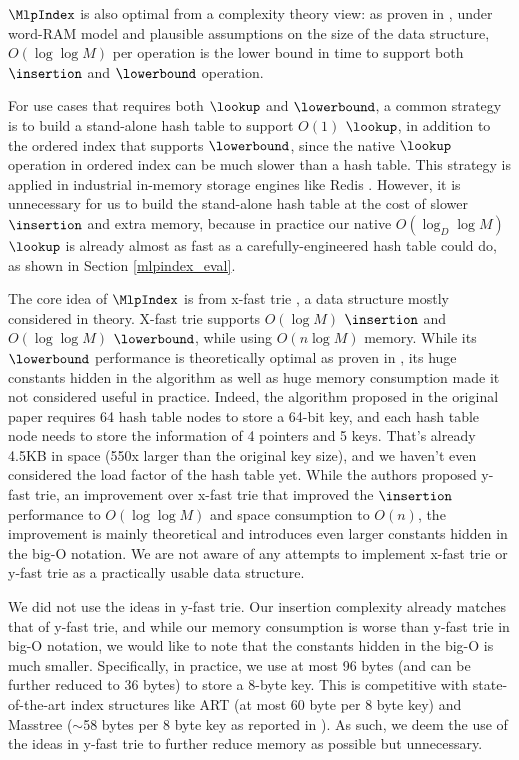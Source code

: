 \documentclass[11pt, usletter]{article}
\begin{document}
$\MlpIndex$ is also optimal from a complexity theory view: as proven in \cite{ajtai88comb-lowerbound}, 
under word-RAM model and plausible assumptions on the size of the data structure, 
$O(\log \log M)$ per operation is the lower bound in time to support both $\insertion$ and $\lowerbound$ operation. 

For use cases that requires both $\lookup$ and $\lowerbound$, 
a common strategy is to build a stand-alone hash table to support $O(1)$ $\lookup$, 
in addition to the ordered index that supports $\lowerbound$, 
since the native $\lookup$ operation in ordered index can be much slower than a hash table.
This strategy is applied in industrial in-memory storage engines like Redis \cite{redis}.
However, it is unnecessary for us to build the stand-alone hash table at the cost of slower $\insertion$ and extra memory, 
because in practice our native $O(\log_D\log M)$ $\lookup$ is already almost as fast as a carefully-engineered hash table could do, 
as shown in Section \ref{mlpindex_eval}.

The core idea of $\MlpIndex$ is from x-fast trie \cite{xfast}, a data structure mostly considered in theory.
X-fast trie supports $O(\log M)$ $\insertion$ and $O(\log\log M)$ $\lowerbound$, while using $O(n\log M)$ memory.
While its $\lowerbound$ performance is theoretically optimal as proven in \cite{ajtai88comb-lowerbound},
its huge constants hidden in the algorithm as well as huge memory consumption made it not considered useful in practice. 
Indeed, the algorithm proposed in the original paper requires 64 hash table nodes to store a 64-bit key, 
and each hash table node needs to store the information of 4 pointers and 5 keys. 
That's already 4.5KB in space (550x larger than the original key size), 
and we haven't even considered the load factor of the hash table yet. 
While the authors proposed y-fast trie, 
an improvement over x-fast trie that improved the $\insertion$ performance to $O(\log\log M)$ and space consumption to $O(n)$, 
the improvement is mainly theoretical and introduces even larger constants hidden in the big-O notation. 
We are not aware of any attempts to implement x-fast trie or y-fast trie as a practically usable data structure. 

We did not use the ideas in y-fast trie. Our insertion complexity already matches that of y-fast trie, 
and while our memory consumption is worse than y-fast trie in big-O notation, 
we would like to note that the constants hidden in the big-O is much smaller.
Specifically, in practice, we use at most 96 bytes (and can be further reduced to 36 bytes) to store a 8-byte key. 
This is competitive with state-of-the-art index structures like ART \cite{arttrie_icde13} (at most 60 byte per 8 byte key) 
and Masstree \cite{masstree} ($\sim$58 bytes per 8 byte key as reported in \cite{hot_sigmod18}).
As such, we deem the use of the ideas in y-fast trie to further reduce memory as possible but unnecessary.
\end{document}
